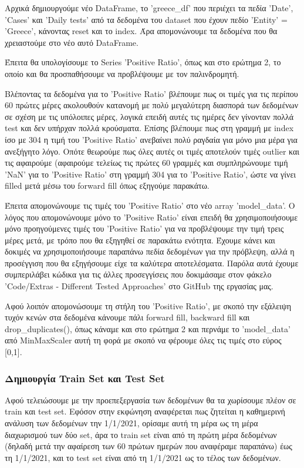 \documentclass[12pt,a4paper]{article}
\begin{document}
Αρχικά δημιουργούμε νέο DataFrame, το 'greece\_df' που περιέχει τα πεδία 'Date', 'Cases' και 'Daily tests' από τα δεδομένα του dataset που έχουν πεδίο 'Entity' = 'Greece', κάνοντας reset και το index. Άρα απομονώνουμε τα δεδομένα που θα χρειαστούμε στο νέο αυτό DataFrame.

Έπειτα θα υπολογίσουμε το Series 'Positive Ratio', όπως και στο ερώτημα 2, το οποίο και θα προσπαθήσουμε να προβλέψουμε με τον παλινδρομητή.

Βλέποντας τα δεδομένα για το 'Positive Ratio' βλέπουμε πως οι τιμές για τις περίπου 60 πρώτες μέρες ακολουθούν κατανομή με πολύ μεγαλύτερη διασπορά των δεδομένων σε σχέση με τις υπόλοιπες μέρες, λογικά επειδή αυτές τις ημέρες δεν γίνονταν πολλά test και δεν υπήρχαν πολλά κρούσματα. Επίσης βλέπουμε πως στη γραμμή με index ίσο με 304 η τιμή του 'Positive Ratio' ανεβαίνει πολύ ραγδαία για μόνο μια μέρα για ανεξήγητο λόγο. Οπότε θεωρούμε πως όλες αυτές οι τιμές αποτελούν τιμές outlier και τις αφαιρούμε (αφαιρούμε τελείως τις πρώτες 60 γραμμές και συμπληρώνουμε τιμή 'NaN' για το 'Positive Ratio' στη γραμμή 304 για το 'Positive Ratio', ώστε να γίνει filled μετά μέσω του forward fill όπως εξηγούμε παρακάτω.

Έπειτα απομονώνουμε τις τιμές του 'Positive Ratio' στο νέο array 'model\_data'. Ο λόγος που απομονώνουμε μόνο το 'Positive Ratio' είναι επειδή θα χρησιμοποιήσουμε μόνο προηγούμενες τιμές του 'Positive Ratio' για να προβλέψουμε την τιμή τρεις μέρες μετά, με τρόπο που θα εξηγηθεί σε παρακάτω ενότητα. Έχουμε κάνει και δοκιμές να χρησιμοποιήσουμε παραπάνω πεδία δεδομένων για την πρόβλεψη, αλλά η προσέγγιση που θα εξηγήσουμε είχε τα καλύτερα αποτελέσματα. Παρόλα αυτά έχουμε συμπεριλάβει κώδικα για τις άλλες προσεγγίσεις που δοκιμάσαμε στον φάκελο 'Code/Extras - Different Tested Approaches' στο GitHub της εργασίας μας.

Αφού λοιπόν απομονώσουμε τη στήλη του 'Positive Ratio', με σκοπό την εξάλειψη τυχόν κενών στα δεδομένα κάνουμε πάλι forward fill, backward fill και drop\_duplicates(), όπως κάναμε και στο ερώτημα 2 και περνάμε το 'model\_data' από MinMaxScaler αυτή τη φορά με σκοπό να φέρουμε όλες τις τιμές στο εύρος [0,1].

\subsubsection{Δημιουργία Train Set και Test Set}

Αφού τελειώσουμε με την προεπεξεργασία των δεδομένων θα τα χωρίσουμε πλέον σε train και test set. Εφόσον στην εκφώνηση αναφέρεται πως ζητείται η καθημερινή ανάλυση των δεδομένων την 1/1/2021, ορίσαμε αυτή τη μέρα ως τη μέρα διαχωρισμού των δύο set, άρα το train set είναι από τη πρώτη μέρα δεδομένων (δηλαδή μετά την αφαίρεση των 60 πρώτων ημερών που αναφέραμε παραπάνω) έως τη 1/1/2021, και το test set είναι από τη 1/1/2021 ως το τέλος των δεδομένων.
\end{document}
